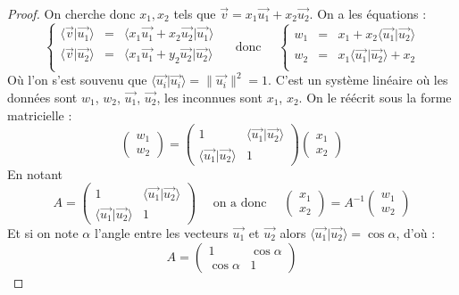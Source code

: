 \documentclass[class=report,crop=false]{standalone}
\newcommand{\vect}{\overrightarrow}
\begin{document}
\begin{proof}
On cherche donc $x_1, x_2$ tels que $\vect v  = x_1 \vect{u_1} + x_2 \vect{u_2}$.
On a les équations :
$$
\left\{
\begin{array}{rcl}
\langle \vect v | \vect{u_1} \rangle &=& \langle x_1 \vect{u_1} + x_2 \vect{u_2} | \vect{u_1} \rangle  \\
\langle \vect v | \vect{u_2} \rangle &=& \langle x_1 \vect{u_1} + y_2 \vect{u_2} | \vect{u_2} \rangle  \\
\end{array}
\right.
\quad\text{ donc }\quad
\left\{
\begin{array}{rcl}
w_1 &=&  x_1+ x_2 \langle \vect{u_1} | \vect{u_2} \rangle  \\
w_2 &=& x_1 \langle \vect{u_1} | \vect{u_2} \rangle+ x_2  \\
\end{array}
\right.
$$
Où l'on s'est souvenu que $\langle \vect{u_i} | \vect{u_i} \rangle = \| \vect{u_i} \|^2 = 1$.
C'est un système linéaire où les données sont $w_1$, $w_2$, $\vect{u_1}$, $\vect{u_2}$, 
les inconnues sont $x_1$, $x_2$. On le réécrit sous la forme matricielle :
$$\begin{pmatrix}w_1\\w_2\end{pmatrix}
= \begin{pmatrix}1&\langle \vect{u_1} | \vect{u_2} \rangle\\ \langle \vect{u_1} | \vect{u_2} \rangle&1\end{pmatrix}
\begin{pmatrix}x_1\\x_2\end{pmatrix}$$
En notant 
$$A = \begin{pmatrix}1&\langle \vect{u_1} | \vect{u_2} \rangle\\ 
\langle \vect{u_1} | \vect{u_2} \rangle&1\end{pmatrix}
\quad \text{ on a donc } \quad 
\begin{pmatrix}x_1\\x_2\end{pmatrix} =  A^{-1} \begin{pmatrix}w_1\\w_2\end{pmatrix}$$
Et si on note $\alpha$ l'angle entre les vecteurs  $\vect{u_1}$ et $\vect{u_2}$ alors
$\langle \vect{u_1} | \vect{u_2} \rangle = \cos \alpha$, d'où :
$$A = \begin{pmatrix}1&\cos \alpha \\ \cos \alpha & 1\end{pmatrix}
$$
\end{proof}
\end{document}
